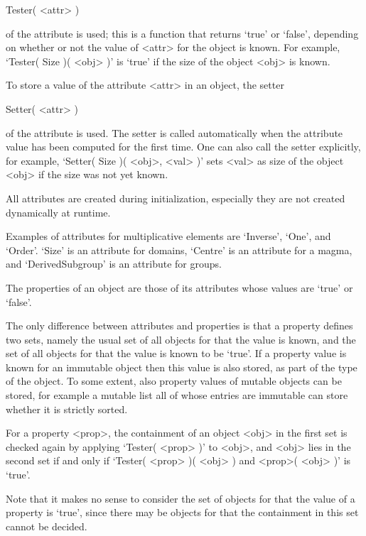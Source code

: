 \>Tester( <attr> )

of the attribute is used;
this is a function that returns `true' or `false',
depending on whether or not the value of <attr> for the object is known.
For example, `Tester( Size )( <obj> )' is `true' if the size of the object
<obj> is known.


To store a value of the attribute <attr> in an object,
the setter

\>Setter( <attr> )

of the attribute is used.
The setter is called automatically when the attribute value has been
computed for the first time.
One can also call the setter explicitly,
for example, `Setter( Size )( <obj>, <val> )' sets <val> as size of the
object <obj> if the size was not yet known.

All attributes are created during initialization,
especially they are not created dynamically at runtime.

Examples of attributes for multiplicative elements are `Inverse', `One',
and `Order'.
`Size' is an attribute for domains, `Centre' is an attribute for a magma,
and `DerivedSubgroup' is an attribute for groups.


The properties of an object are those of its attributes whose values are
`true' or `false'.

The only difference between attributes and properties is that a property
defines two sets,
namely the usual set of all objects for that the value is known,
and the set of all objects for that the value is known to be `true'.
If a property value is known for an immutable object then this value is
also stored, as part of the type of the object.
To some extent, also property values of mutable objects can be stored,
for example a mutable list all of whose entries are immutable can store
whether it is strictly sorted.

For a property <prop>, the containment of an object <obj> in the first
set is checked again by applying `Tester( <prop> )' to <obj>,
and <obj> lies in the second set if and only if
`Tester( <prop> )( <obj> ) and <prop>( <obj> )' is `true'.

Note that it makes no sense to consider the set of objects for that the
value of a property is `true', since there may be objects for that the
containment in this set cannot be decided.

